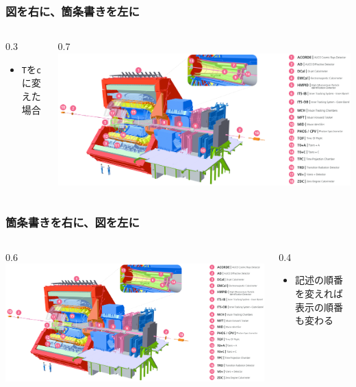 \documentclass[dvipdfmx,12pt,aspectratio=169]{beamer}
\newlength{\mytotalwidth}
\newlength{\mycolumnwidth}
\begin{document}
\begin{frame}\frametitle{図を右に、箇条書きを左に}
\begin{columns}[totalwidth=\mytotalwidth]
\begin{column}[c]{0.3\mycolumnwidth}
\begin{itemize}
    \item \texttt{T}を\texttt{c}に変えた場合
\end{itemize}
\end{column}
\begin{column}[c]{0.7\mycolumnwidth}
\centering
\includegraphics[width=0.7\mycolumnwidth]{ALICE-Run3.png}
\end{column}
\end{columns}
\end{frame}
\begin{frame}\frametitle{箇条書きを右に、図を左に}
\begin{columns}[totalwidth=\mytotalwidth]
\begin{column}[T]{0.6\mycolumnwidth}
\centering
\includegraphics[width=0.6\mycolumnwidth]{ALICE-Run3.png}
\end{column}
\begin{column}[T]{0.4\mycolumnwidth}
\begin{itemize}
    \item 記述の順番を変えれば表示の順番も変わる
\end{itemize}
\end{column}
\end{columns}
\end{frame}
\end{document}
